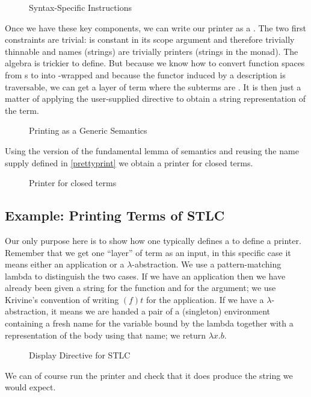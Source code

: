 \begin{figure}[h]
\caption{Syntax-Specific  Instructions\label{fig:printingdisplay}}
\end{figure}

Once we have these key components, we can write our printer as a . The two
first constraints are trivial:  is constant in its scope argument and therefore
trivially thinnable and names (strings) are trivially printers (strings in the 
monad). The algebra is trickier to define. But because we know how to convert 
function spaces from s to  into -wrapped  and
because the functor induced by a description is traversable, we can get a layer of
term where the subterms are . It is then just a matter of applying the
user-supplied  directive to obtain a string representation of the term.

\begin{figure}[h]
\caption{Printing as a Generic Semantics\label{fig:genprinting}}
\end{figure}

Using the  version of the fundamental lemma of semantics and
reusing the name supply defined in \cref{prettyprint} we obtain a printer
for closed terms.

\begin{figure}[h]
\caption{Printer for closed terms\label{fig:genprinter}}
\end{figure}

\subsection{Example: Printing Terms of STLC}
\label{sec:printingexample}

Our only purpose here is to show how one typically defines a  to
define a printer. Remember that we get one ``layer'' of term as an input, in this
specific case it means either an application or a $\lambda$-abstraction. We use
a pattern-matching lambda to distinguish the two cases. If we have an application
then we have already been given a string  for the function and  for the
argument; we use Krivine's convention of writing $(f)t$ for the application. If we
have a $\lambda$-abstraction, it means we are handed a pair of a (singleton) environment
containing a fresh name  for the variable bound by the lambda together with a
representation  of the body using that name; we return $\lambda{}x.b$.

\begin{figure}[h]
\caption{Display Directive for STLC\label{fig:exampledisplay}}
\end{figure}

We can of course run the printer and check that it does produce the string we would
expect.


